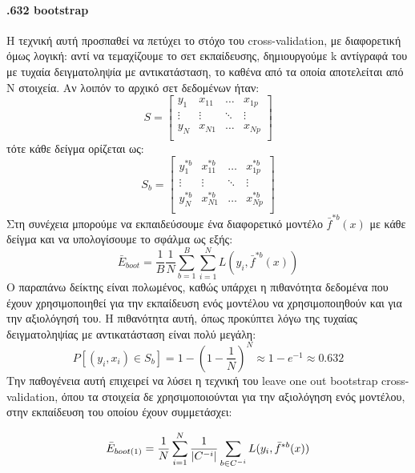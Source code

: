 \paragraph{.632 bootstrap} Η τεχνική αυτή προσπαθεί να πετύχει το στόχο του cross-validation, με διαφορετική όμως λογική: αντί να τεμαχίζουμε το σετ εκπαίδευσης, δημιουργούμε k αντίγραφά του με τυχαία δειγματοληψία με αντικατάσταση, το καθένα από τα οποία αποτελείται από Ν στοιχεία. Αν λοιπόν το αρχικό σετ δεδομένων ήταν:
\begin{equation}
S=
\begin{bmatrix}
y_1 &  x_{11}  & \dots  &   x_{1p} \\
\vdots  & \vdots &\ddots & \vdots \\
y_N &  x_{N1}  & \dots  &   x_{Np} \\
\end{bmatrix}
\end{equation}
τότε κάθε δείγμα ορίζεται ως:
\begin{equation}
S_b=
\begin{bmatrix}
y_1^{*b} &  x_{11}^{*b}  & \dots  &   x_{1p}^{*b} \\
\vdots  & \vdots &\ddots & \vdots \\
y_N^{*b} &  x_{N1}^{*b}  & \dots  &   x_{Np}^{*b} \\
\end{bmatrix}
\end{equation}
Στη συνέχεια μπορούμε να εκπαιδεύσουμε ένα διαφορετικό μοντέλο $\bar{f}^{*b}(x)$ με κάθε δείγμα και να υπολογίσουμε το σφάλμα ως εξής:
\begin{equation}
\bar{E}_{boot}=\frac{1}{B} \frac{1}{N} \sum_{b=1}^{B} \sum_{i=1}^{N} L(y_i,\bar{f}^{*b}(x))
\end{equation}
Ο παραπάνω δείκτης είναι πολωμένος, καθώς υπάρχει η πιθανότητα δεδομένα που έχουν χρησιμοποιηθεί για την εκπαίδευση ενός μοντέλου να χρησιμοποιηθούν και για την αξιολόγησή του. Η πιθανότητα αυτή, όπως προκύπτει λόγω της τυχαίας δειγματοληψίας με αντικατάσταση είναι πολύ μεγάλη:
\begin{equation}
P[(y_i, x_i) \in S_b]= 1- (1- \frac{1}{N})^N \approx 1- e^{-1} \approx 0.632
\end{equation}
Την παθογένεια αυτή επιχειρεί να λύσει η τεχνική του leave one out bootstrap cross-validation, όπου τα στοιχεία δε χρησιμοποιούνται για την αξιολόγηση ενός μοντέλου, στην εκπαίδευση του οποίου έχουν συμμετάσχει:

\begin{equation}
\bar{E}_{boot(1)}=\frac{1}{N} \sum_{i=1}^{N} \frac{1}{\lvert C^{-i}\rvert} \sum_{b \in C^{-i}} L(y_i,\bar{f}^{*b}(x))
\end{equation}

